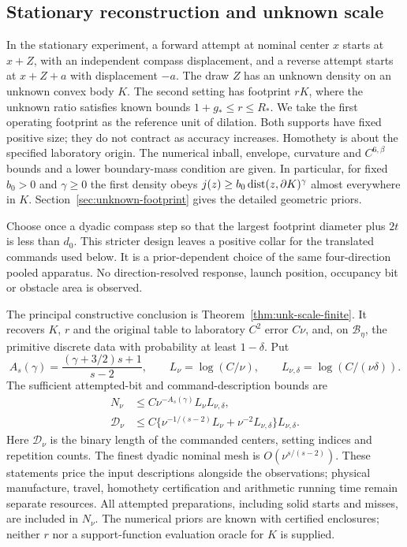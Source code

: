 \subsection{Stationary reconstruction and unknown scale}
In the stationary experiment, a forward attempt at nominal center $x$
starts at $x+Z$, with an independent compass displacement, and a reverse
attempt starts at $x+Z+a$ with displacement $-a$. The draw $Z$ has an
unknown density on an unknown convex body $K$. The second setting has
footprint $rK$, where the unknown ratio satisfies known bounds
$1+g_*\le r\le R_*$. We take the first operating footprint as the
reference unit of dilation. Both supports have fixed positive size;
they do not contract as accuracy increases. Homothety is about the
specified laboratory origin. The numerical inball, envelope, curvature
and $C^{6,\beta}$ bounds and a lower boundary-mass condition are given.
In particular, for fixed $b_0>0$ and $\gamma\ge0$ the first density obeys
$j(z)\ge b_0\operatorname{dist}(z,\partial K)^\gamma$ almost everywhere in $K$.
Section~\ref{sec:unknown-footprint} gives the detailed geometric priors.

Choose once a dyadic compass step so that the largest footprint
diameter plus $2t$ is less than $d_0$. This stricter design leaves a
positive collar for the translated commands used below. It is a
prior-dependent choice of the same four-direction pooled apparatus.
No direction-resolved response, launch position, occupancy bit or
obstacle area is observed.

The principal constructive conclusion is
Theorem~\ref{thm:unk-scale-finite}. It recovers $K$, $r$ and the original
table to laboratory $C^2$ error $C\nu$, and, on $\mathcal B_\eta$, the
primitive discrete data with probability at least $1-\delta$. Put
\begin{equation}\label{eq:new-upper-exponent}
 A_s(\gamma)=\frac{(\gamma+3/2)s+1}{s-2},\qquad
 L_\nu=\log(C/\nu),\qquad L_{\nu,\delta}=\log(C/(\nu\delta)).
\end{equation}
The sufficient attempted-bit and command-description bounds are
\begin{align}
 N_\nu&\le C\nu^{-A_s(\gamma)}L_\nu L_{\nu,\delta},
                                              \label{eq:main-new-attempts}\\
 \mathcal D_\nu&\le C\bigl\{\nu^{-1/(s-2)}L_\nu
                      +\nu^{-2}L_{\nu,\delta}\bigr\}L_{\nu,\delta}.
                                              \label{eq:main-new-control}
\end{align}
Here $\mathcal D_\nu$ is the binary length of the commanded centers,
setting indices and repetition counts. The finest dyadic nominal mesh
is $O(\nu^{s/(s-2)})$. These statements price the input descriptions
alongside the observations; physical manufacture, travel, homothety
certification and arithmetic running time remain separate resources.
All attempted preparations, including solid starts and misses, are
included in $N_\nu$. The numerical priors are known with certified
enclosures; neither $r$ nor a support-function evaluation oracle for
$K$ is supplied.

